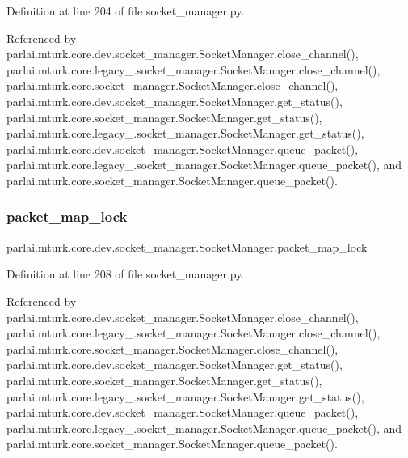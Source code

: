 Definition at line 204 of file socket\+\_\+manager.\+py.



Referenced by parlai.\+mturk.\+core.\+dev.\+socket\+\_\+manager.\+Socket\+Manager.\+close\+\_\+channel(), parlai.\+mturk.\+core.\+legacy\+\_.\+socket\+\_\+manager.\+Socket\+Manager.\+close\+\_\+channel(), parlai.\+mturk.\+core.\+socket\+\_\+manager.\+Socket\+Manager.\+close\+\_\+channel(), parlai.\+mturk.\+core.\+dev.\+socket\+\_\+manager.\+Socket\+Manager.\+get\+\_\+status(), parlai.\+mturk.\+core.\+socket\+\_\+manager.\+Socket\+Manager.\+get\+\_\+status(), parlai.\+mturk.\+core.\+legacy\+\_.\+socket\+\_\+manager.\+Socket\+Manager.\+get\+\_\+status(), parlai.\+mturk.\+core.\+dev.\+socket\+\_\+manager.\+Socket\+Manager.\+queue\+\_\+packet(), parlai.\+mturk.\+core.\+legacy\+\_.\+socket\+\_\+manager.\+Socket\+Manager.\+queue\+\_\+packet(), and parlai.\+mturk.\+core.\+socket\+\_\+manager.\+Socket\+Manager.\+queue\+\_\+packet().

\mbox{\label{classparlai_1_1mturk_1_1core_1_1dev_1_1socket__manager_1_1SocketManager_a2ac5139867a0a05050ff3b388cc0e8fa}} 
\subsubsection{\texorpdfstring{packet\+\_\+map\+\_\+lock}{packet\_map\_lock}}
{\footnotesize\ttfamily parlai.\+mturk.\+core.\+dev.\+socket\+\_\+manager.\+Socket\+Manager.\+packet\+\_\+map\+\_\+lock}



Definition at line 208 of file socket\+\_\+manager.\+py.



Referenced by parlai.\+mturk.\+core.\+dev.\+socket\+\_\+manager.\+Socket\+Manager.\+close\+\_\+channel(), parlai.\+mturk.\+core.\+legacy\+\_.\+socket\+\_\+manager.\+Socket\+Manager.\+close\+\_\+channel(), parlai.\+mturk.\+core.\+socket\+\_\+manager.\+Socket\+Manager.\+close\+\_\+channel(), parlai.\+mturk.\+core.\+dev.\+socket\+\_\+manager.\+Socket\+Manager.\+get\+\_\+status(), parlai.\+mturk.\+core.\+socket\+\_\+manager.\+Socket\+Manager.\+get\+\_\+status(), parlai.\+mturk.\+core.\+legacy\+\_.\+socket\+\_\+manager.\+Socket\+Manager.\+get\+\_\+status(), parlai.\+mturk.\+core.\+dev.\+socket\+\_\+manager.\+Socket\+Manager.\+queue\+\_\+packet(), parlai.\+mturk.\+core.\+legacy\+\_.\+socket\+\_\+manager.\+Socket\+Manager.\+queue\+\_\+packet(), and parlai.\+mturk.\+core.\+socket\+\_\+manager.\+Socket\+Manager.\+queue\+\_\+packet().


